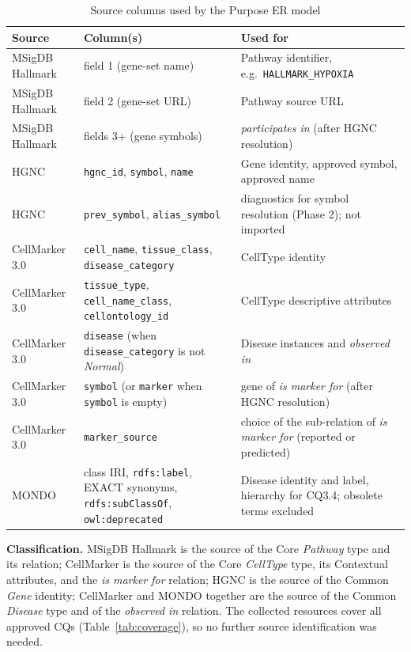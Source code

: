 \begin{table}[htbp]
\centering
\small
\begin{tabularx}{\linewidth}{|l|>{\raggedright\arraybackslash}X|X|}
\hline
\textbf{Source} & \textbf{Column(s)} & \textbf{Used for} \\ \hline
MSigDB Hallmark & field 1 (gene-set name) & Pathway identifier, e.g.\ \texttt{HALLMARK\_HYPOXIA} \\ \hline
MSigDB Hallmark & field 2 (gene-set URL) & Pathway source URL \\ \hline
MSigDB Hallmark & fields 3+ (gene symbols) & \emph{participates in} (after HGNC resolution) \\ \hline
HGNC & \texttt{hgnc\_id}, \texttt{symbol}, \texttt{name} & Gene identity, approved symbol, approved name \\ \hline
HGNC & \texttt{prev\_symbol}, \texttt{alias\_symbol} & diagnostics for symbol resolution (Phase 2); not imported \\ \hline
CellMarker 3.0 & \texttt{cell\_name}, \texttt{tissue\_class}, \texttt{disease\_category} & CellType identity \\ \hline
CellMarker 3.0 & \texttt{tissue\_type}, \texttt{cell\_name\_class}, \texttt{cellontology\_id} & CellType descriptive attributes \\ \hline
CellMarker 3.0 & \texttt{disease} (when \texttt{disease\_category} is not \emph{Normal}) & Disease instances and \emph{observed in} \\ \hline
CellMarker 3.0 & \texttt{symbol} (or \texttt{marker} when \texttt{symbol} is empty) & gene of \emph{is marker for} (after HGNC resolution) \\ \hline
CellMarker 3.0 & \texttt{marker\_source} & choice of the sub-relation of \emph{is marker for} (reported or predicted) \\ \hline
MONDO & class IRI, \texttt{rdfs:label}, EXACT synonyms, \texttt{rdfs:subClassOf}, \texttt{owl:deprecated} & Disease identity and label, hierarchy for CQ3.4; obsolete terms excluded \\ \hline
\end{tabularx}
\caption{Source columns used by the Purpose ER model}
\label{tab:key-columns}
\end{table}

\medskip\noindent\textbf{Classification.} MSigDB Hallmark is the source of the Core \emph{Pathway} type and its relation; CellMarker is the source of the Core \emph{CellType} type, its Contextual attributes, and the \emph{is marker for} relation; HGNC is the source of the Common \emph{Gene} identity; CellMarker and MONDO together are the source of the Common \emph{Disease} type and of the \emph{observed in} relation. The collected resources cover all approved CQs (Table~\ref{tab:coverage}), so no further source identification was needed.

